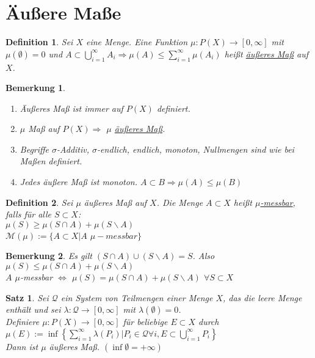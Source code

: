 \documentclass[11pt]{memoir}
\theoremstyle{break}
\newtheorem{Definition}{Definition}[chapter]
\newtheorem{Bemerkung}{Bemerkung}[chapter]
\newtheorem{Satz}{Satz}[chapter]
\begin{document}
\section{Äußere Maße}

\begin{Definition}
Sei $X$ eine Menge. Eine Funktion $\mu: P(X) \rightarrow [0, \infty]$ mit $\mu(\emptyset) = 0$ und $A \subset \bigcup\limits_{i=1}^\infty A_i \Rightarrow \mu(A) \leq \sum\limits_{i=1}^\infty \mu(A_i)$ heißt \underline{äußeres Maß} auf $X$.
\end{Definition}

\begin{Bemerkung}
\begin{enumerate}
	\item Äußeres Maß ist immer auf $P(X)$ definiert.
	\item $\mu$ Maß auf $P(X) \Rightarrow$ $\mu$ \underline{äußeres Maß}. 
	\item Begriffe $\sigma$-Additiv, $\sigma$-endlich, endlich, monoton, Nullmengen sind wie bei Maßen definiert.
	\item Jedes äußere Maß ist monoton. $A \subset B \Rightarrow \mu(A) \leq \mu(B)$
\end{enumerate}
\end{Bemerkung}

\begin{Definition}
Sei $\mu$ äußeres Maß auf $X$. Die Menge $A \subset X$ heißt \underline{$\mu$-messbar}, falls für alle $S \subset X$: \\
$\mu(S) \geq \mu(S \cap A) + \mu(S \backslash A)$ \\
$\mathscr M(\mu):= \{ A \subset X | A$ $ \mu-messbar \}$
\end{Definition}

\begin{Bemerkung}
Es gilt $(S \cap A) \cup (S \backslash A) = S$. Also $\mu(S) \leq \mu(S \cap A) + \mu(S \backslash A)$ \\
$A$ $\mu$-messbar $\Leftrightarrow$ $\mu(S) = \mu(S \cap A) + \mu(S \backslash A)$ $\forall S \subset X$
\end{Bemerkung}

\begin{Satz}
Sei $\mathscr Q$ ein System von Teilmengen einer Menge $X$, das die leere Menge enthält und sei $\lambda: \mathscr Q \rightarrow [0, \infty]$ mit $\lambda(\emptyset) = 0$.\\
Definiere $\mu: P(X) \rightarrow [0, \infty]$ für beliebige $E \subset X$ durch \\
 $\mu(E) := \inf \left\lbrace \sum\limits_{i=1}^\infty \lambda(P_i) | P_i \in \mathscr Q \forall i, E \subset \bigcup\limits_{i=1}^\infty P_i \right\rbrace$ \\
Dann ist $\mu$ äußeres Maß. $(\inf \emptyset = + \infty)$
\end{Satz}
\end{document}
